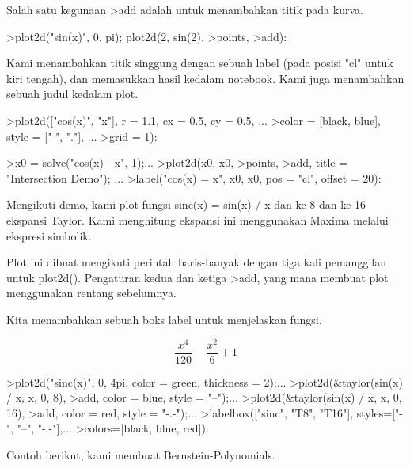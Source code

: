 \documentclass[a4paper,10pt]{article}
\begin{document}
\begin{eulernotebook}
\begin{eulercomment}
\begin{eulercomment}
\begin{eulercomment}
\begin{eulercomment}
\begin{eulercomment}
Salah satu kegunaan \textgreater{}add adalah untuk menambahkan titik pada kurva.
\end{eulercomment}
\begin{eulerprompt}
>plot2d("sin(x)", 0, pi); plot2d(2, sin(2), >points, >add):
\end{eulerprompt}
\begin{eulercomment}
Kami menambahkan titik singgung dengan sebuah label (pada posisi "cl" untuk kiri tengah), dan memasukkan hasil
kedalam notebook. Kami juga menambahkan sebuah judul kedalam plot.
\end{eulercomment}
\begin{eulerprompt}
>plot2d(["cos(x)", "x"], r = 1.1, cx = 0.5, cy = 0.5, ...
>color = [black, blue], style = ["-", "."], ...
>grid = 1):
\end{eulerprompt}
\begin{eulerprompt}
>x0 = solve("cos(x) - x", 1);...
>plot2d(x0, x0, >points, >add, title = "Intersection Demo"); ...
>label("cos(x) = x", x0, x0, pos = "cl", offset = 20):
\end{eulerprompt}
\begin{eulercomment}
Mengikuti demo, kami plot fungsi sinc(x) = sin(x) / x dan ke-8 dan ke-16 ekspansi Taylor. Kami menghitung
ekspansi ini menggunakan Maxima melalui ekspresi simbolik.

Plot ini dibuat mengikuti perintah baris-banyak dengan tiga kali pemanggilan untuk plot2d(). Pengaturan kedua
dan ketiga \textgreater{}add, yang mana membuat plot menggunakan rentang sebelumnya.

Kita menambahkan sebuah boks label untuk menjelaskan fungsi.
\end{eulercomment}
\begin{eulerformula}
\[
\frac{x^4}{120}-\frac{x^2}{6}+1
\]
\end{eulerformula}
\begin{eulerprompt}
>plot2d("sinc(x)", 0, 4pi, color = green, thickness = 2);...
>plot2d(&taylor(sin(x) / x, x, 0, 8), >add, color = blue, style = "--");...
>plot2d(&taylor(sin(x) / x, x, 0, 16), >add, color = red, style = "-.-");...
>labelbox(["sinc", "T8", "T16"], styles=["-", "--", "-.-"],...
>colors=[black, blue, red]):
\end{eulerprompt}
\begin{eulercomment}
Contoh berikut, kami membuat Bernstein-Polynomials.


\end{eulercomment}
\end{eulercomment}
\end{eulercomment}
\end{eulercomment}
\end{eulercomment}
\end{eulernotebook}
\end{document}
